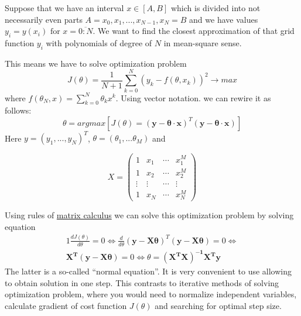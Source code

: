\documentclass[11pt]{article} %
\begin{document}
Suppose that we have an interval $x \in [A,B]$ which is divided into not necessarily even parts $A = x_0, x_1, ..., x_{N-1}, x_N = B$ and we have values $y_i = y(x_i) \text{ for } x = \overline{0:N}$. We want to find the closest approximation of that grid function $y_i$ with polynomials of degree of $N$ in mean-square sense. 

This means we have to solve optimization problem 
\begin{equation}
J(\theta) = \frac{1}{N+1}\sum_{k=0}^{N}\left(y_k-f(\theta,x_k)\right)^2 \to max
\end{equation} where $f(\theta_N,x) =  \sum_{k=0}^N \theta_k x^k$.
Using vector notation. we can rewire it as follows:
\begin{equation}
\theta = argmax\left[J(\theta) = \left(\mathbf{y}-\mathbf{\theta \cdot x}\right)^T\left(\mathbf{y}-\mathbf{\theta \cdot x}\right)\right]
\end{equation} 
Here $y = (y_1, ..., y_N)^T$, $\theta = (\theta_1,...\theta_M)$ and 

\begin{equation}
X = 
\begin{pmatrix}
1 & x_1 & \cdots & x_1^M \\
1 & x_2 & \cdots & x_2^M \\
\vdots & \vdots & \cdots & \vdots \\
1 & x_N & \cdots & x_N^M 
\end{pmatrix}
\nonumber
\end{equation} 

Using rules of \href{http://en.wikipedia.org/wiki/Matrix\_calculus}{matrix calculus} we can solve this optimization problem by solving equation 
\begin{alignat}{1}
\frac{dJ(\theta)}{d\theta} = 0 \iff 
\frac{d}{d\theta} \left(\mathbf{y}-\mathbf{X\theta}\right)^T\left(\mathbf{y}-\mathbf{X\theta}\right) = 0
\iff \nonumber \\
\mathbf{X^T}(\mathbf{y-X\theta}) = 0 \iff \theta = \mathbf{\left(X^T X\right)^{-1}X^T y}
\end{alignat}
The latter is a so-called ``normal equation''. It is very convenient to use allowing to obtain solution in one step. This contrasts to iterative methods of solving optimization problem, where you would need to normalize independent variables, calculate gradient of cost function $J(\theta)$ and searching for optimal step size. 
\end{document}
